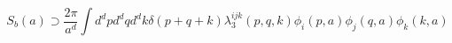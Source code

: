 \begin{equation}
S_b(a) \supset \frac {2\pi} {a^d} \int d^dp d^dq d^dk \delta(p+q+k)
\lambda_3^{ijk}(p,q,k) \phi_i(p,a) \phi_j(q,a) \phi_k(k,a)
\end{equation}

